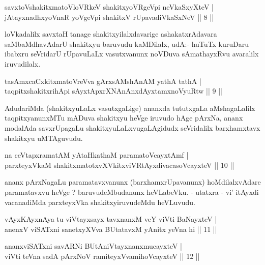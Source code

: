 \begin{shl}
savxtoV\s shakitxmatoVloVRkeV shakitxyoVRgeV\s pi neVkaSxyXteV | \\
jAtayxnadhxyoVnaR yoVgeV\s pi shakitxV rUpavadiVkaSxNeV \hfill ||  8 || 
\end{shl}

\begin{artha}
loVkadalilx savxtaH tanage shakitxyilalxdavarige ashakatxrAdavara saMbaMdhavAdarU shakitxyu baruvudu kaMDilalx, udA:- huTuTx kuruDaru ibabxru seVridarU rUpavuLaLx vasutxvanunx noVDuva sAmathayxRvu avaralilx iruvudilalx.
\end{artha}

\begin{shl}
tasAmxcaCxkitxmatoVreVva gArxsAMshAnAM yathA tathA | \\
taqpitxshakitxrihApi sAyxtApxrXNAnAnxdAyxtamxnoVyuRtw \hfill ||  9 || 
\end{shl}

\begin{artha}
AdudariMda (shakitxyuLaLx vasutxgaLige) ananxda tututxgaLa aMshagaLalilx taqpitxyanunxMTu mADuva shakitxyu heVge iruvudo hAge pArxNa, ananx modalAda savxrUpagaLu shakitxyuLaLxvugaLAgidudx seVridalilx barxhamxtavx shakitxyu uMTAguvudu.
\end{artha}


\begin{shl}
na ceVtapxramatAM yAtaHkathaM paramatoVcayxtAmf | \\
parxteyxVkaM shakitxmatotxvXVkitxviVRtAyxdivacasoVcayxteV \hfill ||  10 || 
\end{shl}

\begin{artha}
ananx pArxNagaLu paramatavxvanunx (barxhamxrUpavanunx) hoMdilalxvAdare paramatavxvu heVge ? baruvudeMbudanunx heVLabeVku. - utatxra - vi' itAyxdi vacanadiMda parxteyxVka shakitxyiruvudeMdu heVLuvudu.
\end{artha}


\begin{shl}
vAyxKAyxnAya tu viVtayxsayx tavxnanxM veY viVti BaNayxteV | \\
anenxV viSATxni sanetxyXVva BUtatavxM yAnitx yeVna hi \hfill ||  11 ||
\end{shl}

\begin{shl}
ananxviSATxni savARNi BUtAniVtayxnanxmucayxteV  | \\
viVti teVna sadA pArxNoV ramiteyxVvamihoVcayxteV \hfill ||  12 || 
\end{shl}

